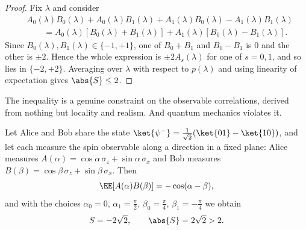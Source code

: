\begin{proof}
	Fix $\lambda$ and consider
	\begin{align*}
		&A_0(\lambda)B_0(\lambda) + A_0(\lambda)B_1(\lambda) + A_1(\lambda)B_0(\lambda) - A_1(\lambda)B_1(\lambda) \\
		&\qquad = A_0(\lambda)\left[B_0(\lambda)+B_1(\lambda)\right] + A_1(\lambda)\left[B_0(\lambda)-B_1(\lambda)\right].
	\end{align*}
	Since $B_0(\lambda), B_1(\lambda) \in \{-1,+1\}$, one of $B_0+B_1$ and $B_0 - B_1$ is $0$ and the other is $\pm2$. Hence the whole expression is $\pm 2 A_s(\lambda)$ for one of $s = 0,1$, and so lies in $\{-2,+2\}$. Averaging over $\lambda$ with respect to $p(\lambda)$ and using linearity of expectation gives $\abs{S}\leq 2$.
\end{proof}

The inequality is a genuine constraint on the observable correlations, derived from nothing but locality and realism. And quantum mechanics violates it.

\begin{theorem}
	Let Alice and Bob share the state $\ket{\psi^-} = \tfrac{1}{\sqrt2}(\ket{01}-\ket{10})$, and let each measure the spin observable along a direction in a fixed plane: Alice measures $A(\alpha) = \cos\alpha\, \sigma_z + \sin\alpha\,\sigma_x$ and Bob measures $B(\beta) = \cos\beta\,\sigma_z + \sin\beta\,\sigma_x$. Then
	$$\EE\!\left[A(\alpha)B(\beta)\right] = -\cos(\alpha-\beta),$$
	and with the choices $\alpha_0 = 0$, $\alpha_1 = \tfrac{\pi}{2}$, $\beta_0 = \tfrac{\pi}{4}$, $\beta_1 = -\tfrac{\pi}{4}$ we obtain
	$$S = -2\sqrt2, \qquad \abs{S} = 2\sqrt{2} > 2.$$
\end{theorem}

